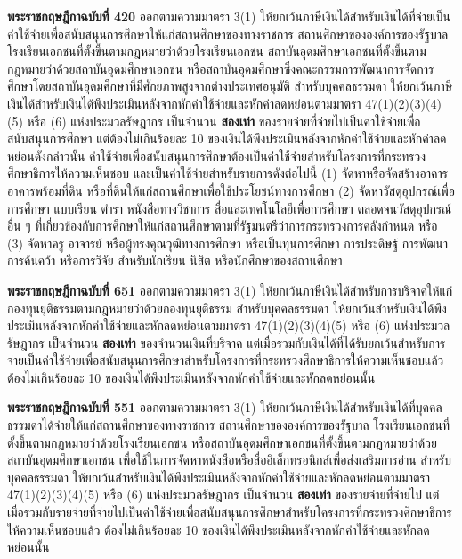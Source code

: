 \documentclass[12pt,a4paper]{article}
\newcommand{\hilight}[1]{\textbf{#1}}
\begin{document}
\textbf{พระราชกฤษฎีกาฉบับที่ 420} ออกตามความมาตรา 3(1) ให้ยกเว้นภาษีเงินได้สำหรับเงินได้ที่จ่ายเป็นค่าใช้จ่ายเพื่อสนับสนุนการศึกษาให้แก่สถานศึกษาของทางราชการ สถานศึกษาขององค์การของรัฐบาล โรงเรียนเอกชนที่ตั้งขึ้นตามกฎหมายว่าด้วยโรงเรียนเอกชน สถาบันอุดมศึกษาเอกชนที่ตั้งขึ้นตามกฎหมายว่าด้วยสถาบันอุดมศึกษาเอกชน หรือสถาบันอุดมศึกษาซึ่งคณะกรรมการพัฒนาการจัดการศึกษาโดยสถาบันอุดมศึกษาที่มีศักยภาพสูงจากต่างประเทศอนุมัติ สำหรับบุคคลธรรมดา ให้ยกเว้นภาษีเงินได้สำหรับเงินได้พึงประเมินหลังจากหักค่าใช้จ่ายและหักค่าลดหย่อนตามมาตรา 47(1)(2)(3)(4)(5) หรือ (6) แห่งประมวลรัษฎากร เป็นจำนวน \hilight{สองเท่า} ของรายจ่ายที่จ่ายไปเป็นค่าใช้จ่ายเพื่อสนับสนุนการศึกษา แต่ต้องไม่เกินร้อยละ 10 ของเงินได้พึงประเมินหลังจากหักค่าใช้จ่ายและหักค่าลดหย่อนดังกล่าวนั้น ค่าใช้จ่ายเพื่อสนับสนุนการศึกษาต้องเป็นค่าใช้จ่ายสำหรับโครงการที่กระทรวงศึกษาธิการให้ความเห็นชอบ และเป็นค่าใช้จ่ายสำหรับรายการดังต่อไปนี้ (1) จัดหาหรือจัดสร้างอาคาร อาคารพร้อมที่ดิน หรือที่ดินให้แก่สถานศึกษาเพื่อใช้ประโยชน์ทางการศึกษา (2) จัดหาวัสดุอุปกรณ์เพื่อการศึกษา แบบเรียน ตำรา หนังสือทางวิชาการ สื่อและเทคโนโลยีเพื่อการศึกษา ตลอดจนวัสดุอุปกรณ์อื่น ๆ ที่เกี่ยวข้องกับการศึกษาให้แก่สถานศึกษาตามที่รัฐมนตรีว่าการกระทรวงการคลังกำหนด หรือ (3) จัดหาครู อาจารย์ หรือผู้ทรงคุณวุฒิทางการศึกษา หรือเป็นทุนการศึกษา การประดิษฐ์ การพัฒนา การค้นคว้า หรือการวิจัย สำหรับนักเรียน นิสิต หรือนักศึกษาของสถานศึกษา

\textbf{พระราชกฤษฎีกาฉบับที่ 651} ออกตามความมาตรา 3(1) ให้ยกเว้นภาษีเงินได้สำหรับการบริจาคให้แก่กองทุนยุติธรรมตามกฎหมายว่าด้วยกองทุนยุติธรรม สำหรับบุคคลธรรมดา ให้ยกเว้นสำหรับเงินได้พึงประเมินหลังจากหักค่าใช้จ่ายและหักลดหย่อนตามมาตรา 47(1)(2)(3)(4)(5) หรือ (6) แห่งประมวลรัษฎากร เป็นจำนวน \hilight{สองเท่า} ของจำนวนเงินที่บริจาค แต่เมื่อรวมกับเงินได้ที่ได้รับยกเว้นสำหรับการจ่ายเป็นค่าใช้จ่ายเพื่อสนับสนุนการศึกษาสำหรับโครงการที่กระทรวงศึกษาธิการให้ความเห็นชอบแล้ว ต้องไม่เกินร้อยละ 10 ของเงินได้พึงประเมินหลังจากหักค่าใช้จ่ายและหักลดหย่อนนั้น

\textbf{พระราชกฤษฎีกาฉบับที่ 551} ออกตามความมาตรา 3(1) ให้ยกเว้นภาษีเงินได้สำหรับเงินได้ที่บุคคลธรรมดาได้จ่ายให้แก่สถานศึกษาของทางราชการ สถานศึกษาขององค์การของรัฐบาล โรงเรียนเอกชนที่ตั้งขึ้นตามกฎหมายว่าด้วยโรงเรียนเอกชน หรือสถาบันอุดมศึกษาเอกชนที่ตั้งขึ้นตามกฎหมายว่าด้วยสถาบันอุดมศึกษาเอกชน เพื่อใช้ในการจัดหาหนังสือหรือสื่ออิเล็กทรอนิกส์เพื่อส่งเสริมการอ่าน สำหรับบุคคลธรรมดา ให้ยกเว้นสำหรับเงินได้พึงประเมินหลังจากหักค่าใช้จ่ายและหักลดหย่อนตามมาตรา 47(1)(2)(3)(4)(5) หรือ (6) แห่งประมวลรัษฎากร เป็นจำนวน \hilight{สองเท่า} ของรายจ่ายที่จ่ายไป แต่เมื่อรวมกับรายจ่ายที่จ่ายไปเป็นค่าใช้จ่ายเพื่อสนับสนุนการศึกษาสำหรับโครงการที่กระทรวงศึกษาธิการให้ความเห็นชอบแล้ว ต้องไม่เกินร้อยละ 10 ของเงินได้พึงประเมินหลังจากหักค่าใช้จ่ายและหักลดหย่อนนั้น
\end{document}

